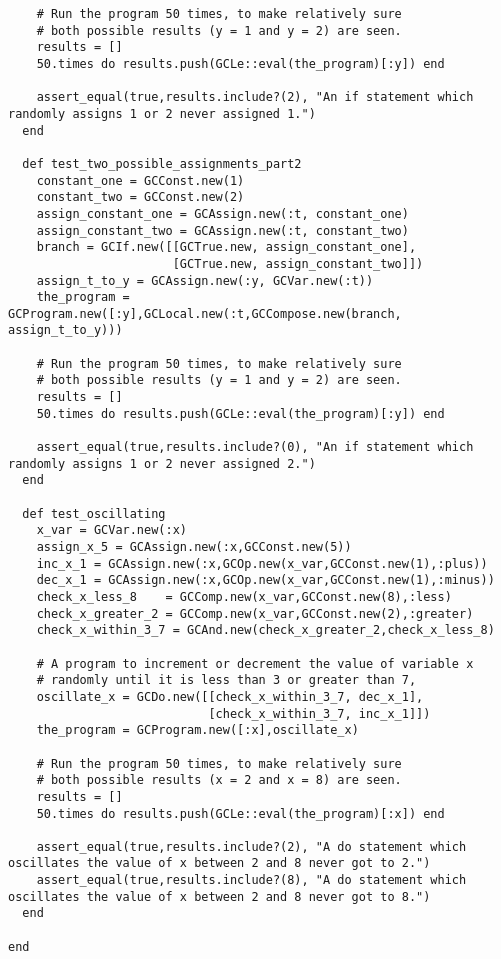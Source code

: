 \documentclass[11pt]{article}
\theoremstyle{definition}
\begin{document}
\begin{verbatim}
    # Run the program 50 times, to make relatively sure
    # both possible results (y = 1 and y = 2) are seen.
    results = []
    50.times do results.push(GCLe::eval(the_program)[:y]) end
  
    assert_equal(true,results.include?(2), "An if statement which randomly assigns 1 or 2 never assigned 1.")
  end

  def test_two_possible_assignments_part2
    constant_one = GCConst.new(1)
    constant_two = GCConst.new(2)
    assign_constant_one = GCAssign.new(:t, constant_one)
    assign_constant_two = GCAssign.new(:t, constant_two)
    branch = GCIf.new([[GCTrue.new, assign_constant_one],
                       [GCTrue.new, assign_constant_two]])
    assign_t_to_y = GCAssign.new(:y, GCVar.new(:t))
    the_program = GCProgram.new([:y],GCLocal.new(:t,GCCompose.new(branch, assign_t_to_y)))

    # Run the program 50 times, to make relatively sure
    # both possible results (y = 1 and y = 2) are seen.
    results = []
    50.times do results.push(GCLe::eval(the_program)[:y]) end
  
    assert_equal(true,results.include?(0), "An if statement which randomly assigns 1 or 2 never assigned 2.")
  end
  
  def test_oscillating
    x_var = GCVar.new(:x)
    assign_x_5 = GCAssign.new(:x,GCConst.new(5))
    inc_x_1 = GCAssign.new(:x,GCOp.new(x_var,GCConst.new(1),:plus))
    dec_x_1 = GCAssign.new(:x,GCOp.new(x_var,GCConst.new(1),:minus))
    check_x_less_8    = GCComp.new(x_var,GCConst.new(8),:less)
    check_x_greater_2 = GCComp.new(x_var,GCConst.new(2),:greater)
    check_x_within_3_7 = GCAnd.new(check_x_greater_2,check_x_less_8)
    
    # A program to increment or decrement the value of variable x
    # randomly until it is less than 3 or greater than 7,
    oscillate_x = GCDo.new([[check_x_within_3_7, dec_x_1],
                            [check_x_within_3_7, inc_x_1]])
    the_program = GCProgram.new([:x],oscillate_x)
    
    # Run the program 50 times, to make relatively sure
    # both possible results (x = 2 and x = 8) are seen.
    results = []
    50.times do results.push(GCLe::eval(the_program)[:x]) end
  
    assert_equal(true,results.include?(2), "A do statement which oscillates the value of x between 2 and 8 never got to 2.")
    assert_equal(true,results.include?(8), "A do statement which oscillates the value of x between 2 and 8 never got to 8.")
  end

end
\end{verbatim}
\end{document}

